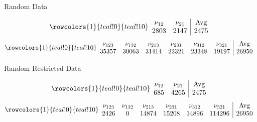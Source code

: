 \documentclass[xcolor=table,dvipsnames]{beamer}
\newcommand{\num}{\nu}
\begin{document}
\begin{frame}{Random Data}
  \begin{center}
  \end{center}

  \vspace{-1pc}
  
  \pause
  $$
  \rowcolors{1}{teal!0}{teal!10}
  \begin{array}{cc|c}
    \num_{12} &\num_{21} & \text{Avg}\\
    2803 & 2147 & 2475
  \end{array}
  $$
  \pause
  $$
  \rowcolors{1}{teal!0}{teal!10}
  \begin{array}{cccccc|c}
    \num_{123} &\num_{132} &\num_{213} &\num_{231} 
      &\num_{312} &\num_{321} & \text{Avg}\\
    35357 & 30063 & 31414 & 22321 & 23348 & 19197 & 26950
  \end{array}
  $$
\end{frame}

\begin{frame}{Random Restricted Data}
  \begin{center}
  \end{center}

  \vspace{-1pc}
  
  \pause
  $$
  \rowcolors{1}{teal!0}{teal!10}
  \begin{array}{cc|c}
    \num_{12} &\num_{21} & \text{Avg}\\
    685 & 4265 & 2475
  \end{array}
  $$
  \pause
  $$
  \rowcolors{1}{teal!0}{teal!10}
  \begin{array}{cccccc|c}
    \num_{123} &\num_{132} &\num_{213} &\num_{231} 
      &\num_{312} &\num_{321} & \text{Avg}\\
    2426 & 0 & 14874 & 15208 & 14896 & 114296 & 26950
  \end{array}
  $$
\end{frame}
\end{document}

